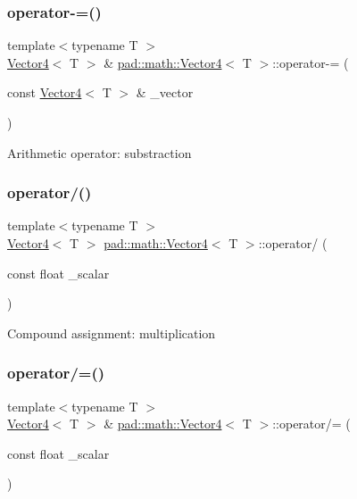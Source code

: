 \subsubsection{\texorpdfstring{operator-\/=()}{operator-=()}}
{\footnotesize\ttfamily template$<$typename T $>$ \\
\mbox{\hyperlink{structpad_1_1math_1_1_vector4}{Vector4}}$<$ T $>$ \& \mbox{\hyperlink{structpad_1_1math_1_1_vector4}{pad\+::math\+::\+Vector4}}$<$ T $>$\+::operator-\/= (\begin{DoxyParamCaption}\item[{const \mbox{\hyperlink{structpad_1_1math_1_1_vector4}{Vector4}}$<$ T $>$ \&}]{\+\_\+vector }\end{DoxyParamCaption})}

Arithmetic operator\+: substraction \mbox{\label{structpad_1_1math_1_1_vector4_ad818def83cbc4255b79ec185450633ca}} 
\subsubsection{\texorpdfstring{operator/()}{operator/()}}
{\footnotesize\ttfamily template$<$typename T $>$ \\
\mbox{\hyperlink{structpad_1_1math_1_1_vector4}{Vector4}}$<$ T $>$ \mbox{\hyperlink{structpad_1_1math_1_1_vector4}{pad\+::math\+::\+Vector4}}$<$ T $>$\+::operator/ (\begin{DoxyParamCaption}\item[{const float}]{\+\_\+scalar }\end{DoxyParamCaption})}

Compound assignment\+: multiplication \mbox{\label{structpad_1_1math_1_1_vector4_a3703b229047d4cd251215a409c8ad7a5}} 
\subsubsection{\texorpdfstring{operator/=()}{operator/=()}}
{\footnotesize\ttfamily template$<$typename T $>$ \\
\mbox{\hyperlink{structpad_1_1math_1_1_vector4}{Vector4}}$<$ T $>$ \& \mbox{\hyperlink{structpad_1_1math_1_1_vector4}{pad\+::math\+::\+Vector4}}$<$ T $>$\+::operator/= (\begin{DoxyParamCaption}\item[{const float}]{\+\_\+scalar }\end{DoxyParamCaption})}

